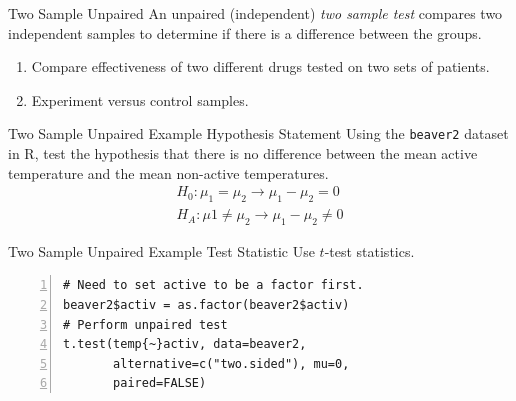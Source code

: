 \documentclass[xcolor=svgnames, 10pt, handout]{beamer}
\begin{document}
\begin{frame}[fragile]{Two Sample Unpaired}
\vfill
An unpaired (independent) \emph{two sample test} compares two independent samples to determine if there is a difference between the groups.
\vfill
\begin{example}
\begin{enumerate}
\item Compare effectiveness of two different drugs tested on two sets of patients.\\
\item Experiment versus control samples.
\end{enumerate}
\end{example}
\vfill
\end{frame}


\begin{frame}[fragile]{Two Sample Unpaired Example
Hypothesis Statement}
Using the \verb|beaver2| dataset in R, test the hypothesis that there is no difference between the mean active temperature and the mean non-active temperatures.
\begin{align*}
H_0 : \mu_1 = \mu_2 \to \mu_1 -\mu_2 = 0 \\
H_A : \mu1 \neq \mu_2 \to \mu_1 - \mu_2 \neq 0
\end{align*}
\end{frame}


\begin{frame}[fragile]{Two Sample Unpaired Example Test Statistic}
\vfill
Use $t$-test statistics.
\vfill
\begin{Verbatim}[xleftmargin=2em, xrightmargin=1.5em, frame=single, numbers=left, label=Using P-value, framesep=0.5em, commandchars=\\\{\}]
# Need to set active to be a factor first.
beaver2$activ = as.factor(beaver2$activ)
# Perform unpaired test
t.test(temp{~}activ, data=beaver2,
       alternative=c("two.sided"), mu=0,
       paired=FALSE)
\end{Verbatim}
\vfill
\end{frame}
\end{document}
